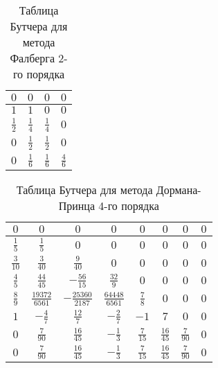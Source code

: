 \begin{table}
    \caption{Таблица Бутчера для метода Фалберга 2-го порядка}
    \begin{tabular}{|c|c|c|c|}
    \hline
    $0$ & $0$ & $0$ & $0$\\
    \hline
    $1$ & $1$ & $0$ & $0$\\
    \hline
    $\frac{1}{2}$ & $\frac{1}{4}$ & $\frac{1}{4}$ & $0$\\
    \hline
    $0$ & \cellcolor{lightgray} $\frac{1}{2}$ & \cellcolor{lightgray} $\frac{1}{2}$ & \cellcolor{lightgray} $0$\\
    \hline
    $0$ & \cellcolor{lightgray} $\frac{1}{6}$ & \cellcolor{lightgray} $\frac{1}{6}$ & \cellcolor{lightgray} $\frac{4}{6}$\\
    \hline
    \end{tabular}
    \label{tab:Falberg2}
\end{table}

\begin{table}    
    \caption{Таблица Бутчера для метода Дормана-Принца 4-го порядка}
    \begin{tabular}{|c|c|c|c|c|c|c|c|}
    \hline
    $0$ & $0$ & $0$ & $0$ & $0$ & $0$ & $0$ & $0$\\
    \hline
    $\frac{1}{5}$ & $\frac{1}{5}$ & $0$ & $0$ & $0$ & $0$ & $0$ & $0$\\
    \hline
    $\frac{3}{10}$ & $\frac{3}{40}$ & $\frac{9}{40}$ & $0$ & $0$ & $0$ & $0$ & $0$\\
    \hline
    $\frac{4}{5}$ & $\frac{44}{45}$ & $-\frac{56}{15}$ & $\frac{32}{9}$ & $0$ & $0$ & $0$ & $0$\\
    \hline
    $\frac{8}{9}$ & $\frac{19372}{6561}$ & $-\frac{25360}{2187}$ & $\frac{64448}{6561}$ & $\frac{7}{8}$ & $0$ & $0$ & $0$\\
    \hline
    $1$ & $-\frac{4}{7}$ & $\frac{12}{7}$ & $-\frac{2}{7}$ & $-1$ & $7$ & $0$ & $0$\\
    \hline
    $0$ & \cellcolor{lightgray} $\frac{7}{90}$ & \cellcolor{lightgray} $\frac{16}{45}$ & \cellcolor{lightgray} $-\frac{1}{3}$ & \cellcolor{lightgray} $\frac{7}{15}$ & \cellcolor{lightgray} $\frac{16}{45}$ & \cellcolor{lightgray} $\frac{7}{90}$ & \cellcolor{lightgray} $0$\\
    \hline
    $0$ & \cellcolor{lightgray} $\frac{7}{90}$ & \cellcolor{lightgray} $\frac{16}{45}$ & \cellcolor{lightgray} $-\frac{1}{3}$ & \cellcolor{lightgray} $\frac{7}{15}$ & \cellcolor{lightgray} $\frac{16}{45}$ & \cellcolor{lightgray} $\frac{7}{90}$ & \cellcolor{lightgray} $0$\\
    \hline
    \end{tabular}
    \label{tab:DP4}
\end{table}

